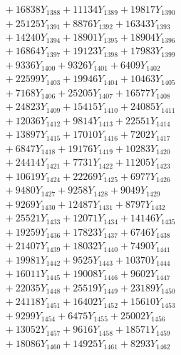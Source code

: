 \documentclass[a4paper,10pt]{article}
\begin{document}
{\begin{align}
&\;  + 16838 Y_{1388} + 11134 Y_{1389} + 19817 Y_{1390} \\[0.3ex]
&\;  + 25125 Y_{1391} + 8876 Y_{1392} + 16343 Y_{1393} \\[0.3ex]
&\;  + 14240 Y_{1394} + 18901 Y_{1395} + 18904 Y_{1396} \\[0.3ex]
&\;  + 16864 Y_{1397} + 19123 Y_{1398} + 17983 Y_{1399} \\[0.3ex]
&\;  + 9336 Y_{1400} + 9326 Y_{1401} + 6409 Y_{1402} \\[0.3ex]
&\;  + 22599 Y_{1403} + 19946 Y_{1404} + 10463 Y_{1405} \\[0.3ex]
&\;  + 7168 Y_{1406} + 25205 Y_{1407} + 16577 Y_{1408} \\[0.5ex]\allowbreak
&\;  + 24823 Y_{1409} + 15415 Y_{1410} + 24085 Y_{1411} \\[0.3ex]
&\;  + 12036 Y_{1412} + 9814 Y_{1413} + 22551 Y_{1414} \\[0.3ex]
&\;  + 13897 Y_{1415} + 17010 Y_{1416} + 7202 Y_{1417} \\[0.3ex]
&\;  + 6847 Y_{1418} + 19176 Y_{1419} + 10283 Y_{1420} \\[0.3ex]
&\;  + 24414 Y_{1421} + 7731 Y_{1422} + 11205 Y_{1423} \\[0.3ex]
&\;  + 10619 Y_{1424} + 22269 Y_{1425} + 6977 Y_{1426} \\[0.3ex]
&\;  + 9480 Y_{1427} + 9258 Y_{1428} + 9049 Y_{1429} \\[0.3ex]
&\;  + 9269 Y_{1430} + 12487 Y_{1431} + 8797 Y_{1432} \\[0.3ex]
&\;  + 25521 Y_{1433} + 12071 Y_{1434} + 14146 Y_{1435} \\[0.3ex]
&\;  + 19259 Y_{1436} + 17823 Y_{1437} + 6746 Y_{1438} \\[0.5ex]\allowbreak
&\;  + 21407 Y_{1439} + 18032 Y_{1440} + 7490 Y_{1441} \\[0.3ex]
&\;  + 19981 Y_{1442} + 9525 Y_{1443} + 10370 Y_{1444} \\[0.3ex]
&\;  + 16011 Y_{1445} + 19008 Y_{1446} + 9602 Y_{1447} \\[0.3ex]
&\;  + 22035 Y_{1448} + 25519 Y_{1449} + 23189 Y_{1450} \\[0.3ex]
&\;  + 24118 Y_{1451} + 16402 Y_{1452} + 15610 Y_{1453} \\[0.3ex]
&\;  + 9299 Y_{1454} + 6475 Y_{1455} + 25002 Y_{1456} \\[0.3ex]
&\;  + 13052 Y_{1457} + 9616 Y_{1458} + 18571 Y_{1459} \\[0.3ex]
&\;  + 18086 Y_{1460} + 14925 Y_{1461} + 8293 Y_{1462} \\[0.3ex]

\end{align}}
\end{document}
